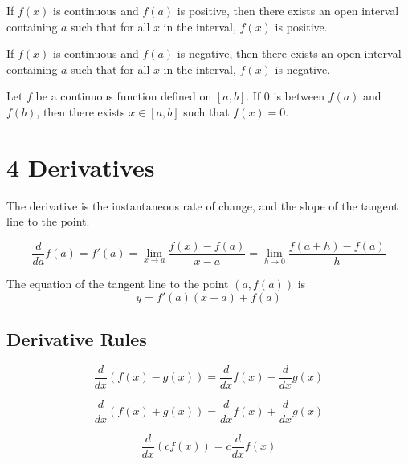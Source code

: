 \begin{namedtheorem}
  If $f(x)$ is continuous and $f(a)$ is positive, then there exists an open interval containing $a$ such that for all $x$ in the interval, $f(x)$ is positive.

  If $f(x)$ is continuous and $f(a)$ is negative, then there exists an open interval containing $a$ such that for all $x$ in the interval, $f(x)$ is negative.
\end{namedtheorem}

\begin{namedtheorem}
  Let $f$ be a continuous function defined on $[a, b]$. If $0$ is between $f (a)$ and $f (b)$, then there exists $x \in [a, b]$ such that $f (x) = 0$.
\end{namedtheorem}

\pagebreak

\section*{4 Derivatives}

The derivative is the instantaneous rate of change, and the slope of the tangent line to the point.

\begin{definition}[Derivative ($f'(a)$)]
  \[
    \frac{d}{da} f(a) = f'(a) = \lim_{x \to a} \frac{f(x)-f(a)}{x - a} = \lim_{h \to 0} \frac{f(a+h)-f(a)}{h}
  \]
\end{definition}

\begin{theorem}
  The equation of the tangent line to the point $(a, f(a))$ is
  \[
    y = f'(a)(x-a) + f(a)
  \]
\end{theorem}

\subsection*{Derivative Rules}

\begin{theorem}
  \[
    \frac{d}{dx}(f(x) - g(x)) = \frac{d}{dx}f(x) - \frac{d}{dx}g(x)
  \]
\end{theorem}

\begin{theorem}
  \[
    \frac{d}{dx}(f(x) + g(x)) = \frac{d}{dx}f(x) + \frac{d}{dx}g(x)
  \]
\end{theorem}

\begin{theorem}
  \[
    \frac{d}{dx}(cf(x)) = c\frac{d}{dx}f(x)
  \]
\end{theorem}

